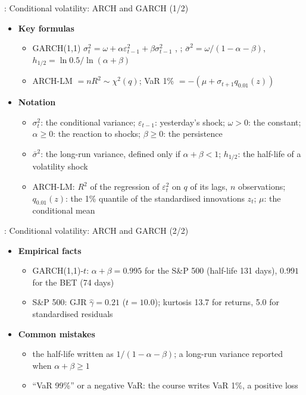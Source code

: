 \begin{frame}{: Conditional volatility: ARCH and GARCH (1/2)}
\itemsize{\footnotesize}
\begin{itemize}
    \item \textbf{Key formulas}
    \begin{itemize}
        \item GARCH(1,1) $\sigma_t^2 = \omega + \alpha\varepsilon_{t-1}^2 + \beta\sigma_{t-1}^2$ , ; $\bar\sigma^2 = \omega/(1 - \alpha - \beta)$, $h_{1/2} = \ln 0.5/\ln(\alpha + \beta)$
        \item ARCH-LM $= nR^2 \sim \chi^2(q)$; VaR 1\% $= -(\mu + \sigma_{t+1}q_{0.01}(z))$
    \end{itemize}
    \item \textbf{Notation}
    \begin{itemize}
        \item $\sigma_t^2$: the conditional variance; $\varepsilon_{t-1}$: yesterday's shock; $\omega > 0$: the constant; $\alpha \ge 0$: the reaction to shocks; $\beta \ge 0$: the persistence
        \item $\bar\sigma^2$: the long-run variance, defined only if $\alpha + \beta < 1$; $h_{1/2}$: the half-life of a volatility shock
        \item ARCH-LM: $R^2$ of the regression of $\varepsilon_t^2$ on $q$ of its lags, $n$ observations; $q_{0.01}(z)$: the 1\% quantile of the standardised innovations $z_t$; $\mu$: the conditional mean
    \end{itemize}
\end{itemize}
\end{frame}

\begin{frame}{: Conditional volatility: ARCH and GARCH (2/2)}
\itemsize{\footnotesize}
\begin{itemize}
    \item \textbf{Empirical facts}
    \begin{itemize}
        \item GARCH(1,1)-$t$: $\alpha + \beta = 0.995$ for the S\&P 500 (half-life 131 days), $0.991$ for the BET (74 days)
        \item S\&P 500: GJR $\hat\gamma = 0.21$ ($t = 10.0$); kurtosis 13.7 for returns, 5.0 for standardised residuals
    \end{itemize}
    \item \textbf{Common mistakes}
    \begin{itemize}
        \item the half-life written as $1/(1 - \alpha - \beta)$; a long-run variance reported when $\alpha + \beta \ge 1$
        \item ``VaR 99\%'' or a negative VaR: the course writes VaR 1\%, a positive loss
    \end{itemize}
\end{itemize}
\end{frame}

